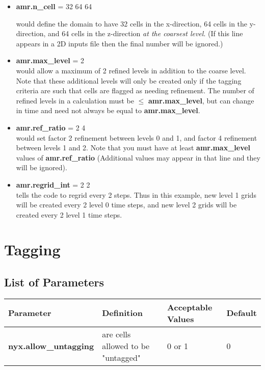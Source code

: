 \begin{itemize}

\item {\bf amr.n\_cell} = 32 64 64

would define the domain to have 32 cells in the x-direction, 64 cells in the y-direction, 
and 64 cells in the z-direction {\em{at the coarsest level}}. 
(If this line appears in a 2D inputs file then the final number will be ignored.)

\item {\bf amr.max\_level} = 2 \\ 
would allow a maximum  of 2 refined levels in addition to the coarse level.   
Note that these additional levels will only be created only if the tagging criteria 
are such that cells are flagged as needing refinement.  The number of refined levels 
in a calculation must be $\leq$ {\bf amr.max\_level}, but can change in time and need
not always be equal to {\bf amr.max\_level}.
 
\item {\bf amr.ref\_ratio} = 2 4 \\ 
would set factor 2 refinement between levels 0 and 1, and factor 4 refinement between levels 1 and 2. 
Note that you must have at least {\bf amr.max\_level} values of {\bf amr.ref\_ratio} 
(Additional values may appear in that line and they will be ignored).

\item {\bf amr.regrid\_int} = 2 2 \\
tells the code to regrid every 2 steps.  Thus in this example, new level 1 grids will be created every 2 level 0 time steps, and
new level 2 grids will be created every 2 level 1 time steps.

\end{itemize}

\section{Tagging}

\subsection{List of Parameters}

\begin{table*}[h]
\begin{scriptsize}
\begin{center}
\begin{tabular}{|l|l|l|l|} \hline
Parameter & Definition & Acceptable Values &Default\\
\hline
{\bf nyx.allow\_untagging} & are cells allowed to be "untagged" & 0 or 1 & 0 \\
\hline
\end{tabular}
\label{Table:Tagging}
\end{center}
\end{scriptsize}
\end{table*}

